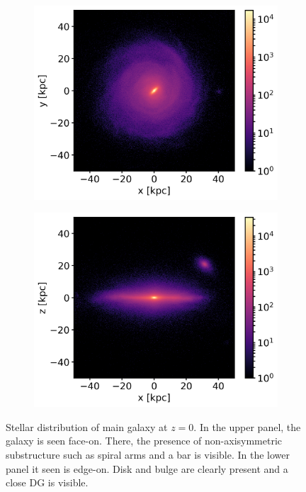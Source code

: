 \begin{figure}[htbp]
\captionsetup{format=plain}
    \centering
    \begin{subfigure}[b]{0.8\textwidth}
	    \includegraphics[width=\textwidth]{plots/Auriga/Au24_stars_xy_distribution_halo0_zoomin.png}
	    \label{fig:Au24_stars_xy_zoomin}
    \end{subfigure}
    
    \begin{subfigure}[b]{0.8\textwidth}
    \centering
    	\includegraphics[width=\textwidth]{plots/Auriga/Au24_stars_xz_distribution_halo0_zoomin.png}
    	\label{fig:Au24_stars_xz_zoomin}
    \end{subfigure}
    \caption{Stellar distribution of main galaxy at $\textit{z}=0$. In the upper panel, the galaxy is seen face-on. There, the presence of non-axisymmetric substructure such as spiral arms and a bar is visible. In the lower panel it seen is edge-on. Disk and bulge are clearly present and a close \ac{DG} is visible.}\label{fig:Stars_AU24_zoomin}
\end{figure}
